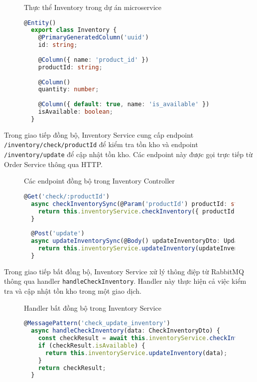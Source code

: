 \begin{figure}[H]{Thực thể Inventory trong dự án microservice}
  \centering
  \begin{minipage}{\textwidth}
    \begin{lstlisting}[language=Typescript, basicstyle=\scriptsize\ttfamily]
  @Entity()
  export class Inventory {
    @PrimaryGeneratedColumn('uuid')
    id: string;
  
    @Column({ name: 'product_id' })
    productId: string;
  
    @Column()
    quantity: number;
  
    @Column({ default: true, name: 'is_available' })
    isAvailable: boolean;
  }
  \end{lstlisting}
  \end{minipage}
\end{figure}

Trong giao tiếp đồng bộ, Inventory Service cung cấp endpoint \texttt{/inventory/check/{productId}} để kiểm tra tồn kho và endpoint \texttt{/inventory/update} để cập nhật tồn kho. Các endpoint này được gọi trực tiếp từ Order Service thông qua HTTP.

\begin{figure}[H]{Các endpoint đồng bộ trong Inventory Controller}
  \centering
  \begin{minipage}{\textwidth}
    \begin{lstlisting}[language=Typescript, basicstyle=\scriptsize\ttfamily]
  @Get('check/:productId')
  async checkInventorySync(@Param('productId') productId: string) {
    return this.inventoryService.checkInventory({ productId, quantity: 1 });
  }
  
  @Post('update')
  async updateInventorySync(@Body() updateInventoryDto: UpdateInventoryDto) {
    return this.inventoryService.updateInventory(updateInventoryDto);
  }
  \end{lstlisting}
  \end{minipage}
\end{figure}

Trong giao tiếp bất đồng bộ, Inventory Service xử lý thông điệp từ RabbitMQ thông qua handler \texttt{handleCheckInventory}. Handler này thực hiện cả việc kiểm tra và cập nhật tồn kho trong một giao dịch.

\begin{figure}[H]{Handler bất đồng bộ trong Inventory Service}
  \centering
  \begin{minipage}{\textwidth}
    \begin{lstlisting}[language=Typescript, basicstyle=\scriptsize\ttfamily]
  @MessagePattern('check_update_inventory')
  async handleCheckInventory(data: CheckInventoryDto) {
    const checkResult = await this.inventoryService.checkInventory(data);
    if (checkResult.isAvailable) {
      return this.inventoryService.updateInventory(data);
    }
    return checkResult;
  }
  \end{lstlisting}
  \end{minipage}
\end{figure}


